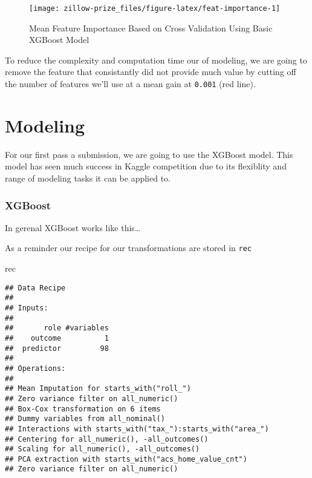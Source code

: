\documentclass[]{book}
\newenvironment{Shaded}{\begin{snugshade}}{\end{snugshade}}
\newcommand{\KeywordTok}[1]{\textcolor[rgb]{0.13,0.29,0.53}{\textbf{#1}}}
\newcommand{\FloatTok}[1]{\textcolor[rgb]{0.00,0.00,0.81}{#1}}
\newcommand{\StringTok}[1]{\textcolor[rgb]{0.31,0.60,0.02}{#1}}
\newcommand{\OperatorTok}[1]{\textcolor[rgb]{0.81,0.36,0.00}{\textbf{#1}}}
\newcommand{\NormalTok}[1]{#1}
\theoremstyle{definition}
\theoremstyle{definition}
\theoremstyle{definition}
\theoremstyle{remark}
\begin{document}
\begin{figure}
\texttt{[image: zillow-prize\_files/figure-latex/feat-importance-1]} \caption{Mean Feature Importance Based on Cross Validation Using Basic XGBoost Model}\label{fig:feat-importance}
\end{figure}

To reduce the complexity and computation time our of modeling, we are
going to remove the feature that consistantly did not provide much value
by cutting off the number of features we'll use at a mean gain at
\texttt{0.001} (red line).

\begin{Shaded}
\end{Shaded}

\chapter{Modeling}\label{modeling}

For our first pass a submission, we are going to use the XGBoost model.
This model has seen much success in Kaggle competition due to its
flexiblity and range of modeling tasks it can be applied to.

\subsection{XGBoost}\label{xgboost}

In gerenal XGBoost works like this\ldots{}

As a reminder our recipe for our transformations are stored in
\texttt{rec}

\begin{Shaded}
\begin{Highlighting}[]
\NormalTok{rec}
\end{Highlighting}
\end{Shaded}

\begin{verbatim}
## Data Recipe
## 
## Inputs:
## 
##       role #variables
##    outcome          1
##  predictor         98
## 
## Operations:
## 
## Mean Imputation for starts_with("roll_")
## Zero variance filter on all_numeric()
## Box-Cox transformation on 6 items
## Dummy variables from all_nominal()
## Interactions with starts_with("tax_"):starts_with("area_")
## Centering for all_numeric(), -all_outcomes()
## Scaling for all_numeric(), -all_outcomes()
## PCA extraction with starts_with("acs_home_value_cnt")
## Zero variance filter on all_numeric()
\end{verbatim}
\end{document}
